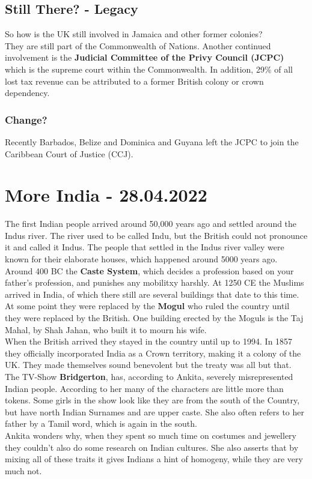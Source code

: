 \documentclass{article}
\begin{document}
	\subsection{Still There? - Legacy}
	So how is the UK still involved in Jamaica and other former colonies? \\
	They are still part of the Commonwealth of Nations. Another continued involvement is the \textbf{Judicial Committee of the Privy Council (JCPC)} which is the supreme court within the Commonwealth. In addition, 29\% of all lost tax revenue can be attributed to a former British colony or crown dependency. \\
	\subsubsection{Change?}
	Recently Barbados, Belize and Dominica and Guyana left the JCPC to join the Caribbean Court of Justice (CCJ).

	\section{More India - 28.04.2022}

	The first Indian people arrived around 50,000 years ago and settled around the Indus river. The river used to be called Indu, but the British could not pronounce it and called it Indus. The people that settled in the Indus river valley were known for their elaborate houses, which happened around 5000 years ago. \\
	Around 400 BC the \textbf{Caste System}, which decides a profession based on your father's profession, and punishes any mobilitxy harshly. At 1250 CE the Muslims arrived in India, of which there still are several buildings that date to this time. At some point they were replaced by the \textbf{Mogul} who ruled the country until they were replaced by the British. One building erected by the Moguls is the Taj Mahal, by Shah Jahan, who built it to mourn his wife. \\
	When the British arrived they stayed in the country until up to 1994. In 1857 they officially incorporated India as a Crown territory, making it a colony of the UK. They made themselves sound benevolent but the treaty was all but that. \\
	The TV-Show \textbf{Bridgerton}, has, according to Ankita, severely misrepresented Indian people. According to her many of the characters are little more than tokens. Some girls in the show look like they are from the south of the Country, but have north Indian Surnames and are upper caste. She also often refers to her father by a Tamil word, which is again in the south. \\
	Ankita wonders why, when they spent so much time on costumes and jewellery they couldn't also do some research on Indian cultures. She also asserts that by mixing all of these traits it gives Indians a hint of homogeny, while they are very much not. \\
\end{document}
